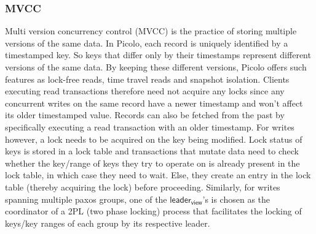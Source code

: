 \subsubsection{MVCC}
Multi version concurrency control (MVCC) is the practice of storing multiple versions of the same data. In \textsf{Picolo}, each record is uniquely identified by a timestamped key. So keys that differ only by their timestamps represent different versions of the same data. By keeping these different versions, \textsf{Picolo} offers such features as lock-free reads, time travel reads and snapshot isolation. Clients executing read transactions therefore need not acquire any locks since any concurrent writes on the same record have a newer timestamp and won't affect its older timestamped value. Records can also be fetched from the past by specifically executing a read transaction with an older timestamp. For writes however, a lock needs to be acquired on the key being modified. Lock status of keys is stored in a lock table and transactions that mutate data need to check whether the key/range of keys they try to operate on is already present in the lock table, in which case they need to wait. Else, they create an entry in the lock table (thereby acquiring the lock) before proceeding. Similarly, for writes spanning multiple paxos groups, one of the $\textsf{leader}_\textsf{view}$'s is chosen as the coordinator of a \textsf{2PL} (two phase locking) process that facilitates the locking of keys/key ranges of each group by its respective leader.

